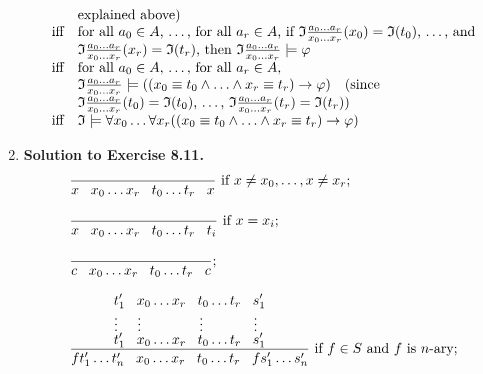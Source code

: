 \begin{enumerate}[1.]
\[\begin{array}{ll}
\, & \mbox{explained above)} \\
\mbox{iff} & \mbox{for all $a_0 \in A$, \ldots , for all $a_r \in A$, if $\mathfrak{I} \frac{a_0 \ldots a_r}{x_0 \ldots x_r}(x_0) = \mathfrak{I}(t_0)$, \ldots , and} \\
\, & \mbox{$\mathfrak{I} \frac{a_0 \ldots a_r}{x_0 \ldots x_r}(x_r) = \mathfrak{I}(t_r)$, then $\mathfrak{I} \frac{a_0 \ldots a_r}{x_0 \ldots x_r} \models \varphi$} \\
\mbox{iff} & \mbox{for all $a_0 \in A$, \ldots , for all $a_r \in A$,} \\
\, & \mbox{$\mathfrak{I} \frac{a_0 \ldots a_r}{x_0 \ldots x_r} \models ((x_0 \equiv t_0 \land \ldots \land x_r \equiv t_r) \rightarrow \varphi)$ \,\, (since} \\
\, & \mbox{$\mathfrak{I} \frac{a_0 \ldots a_r}{x_0 \ldots x_r}(t_0) = \mathfrak{I}(t_0)$, \ldots , $\mathfrak{I} \frac{a_0 \ldots a_r}{x_0 \ldots x_r}(t_r) = \mathfrak{I}(t_r)$)} \\
\mbox{iff} & \mathfrak{I} \models \forall x_0 \ldots \forall x_r (( x_0 \equiv t_0 \land \ldots \land x_r \equiv t_r ) \rightarrow \varphi )
\end{array}
\]
%
\item \textbf{Solution to Exercise 8.11.}
\[
\begin{array}{l}
\displaystyle \frac{\,}{x \;\;\; x_0 \ldots x_r \;\;\; t_0 \ldots t_r \;\;\; x} \mbox{ if $x \neq x_0, \ldots , x \neq x_r$}; \\
\, \\
\displaystyle \frac{\,}{x \;\;\; x_0 \ldots x_r \;\;\; t_0 \ldots t_r \;\;\; t_i} \mbox{ if $x = x_i$}; \\
\, \\
\displaystyle \frac{\,}{c \;\;\; x_0 \ldots x_r \;\;\; t_0 \ldots t_r \;\;\; c}; \\
\, \\
\displaystyle \frac{{{\displaystyle  t_1^\prime \;\;\; x_0 \ldots x_r \;\;\; t_0 \ldots t_r \;\;\; s_1^\prime 
\atop 
\displaystyle  \;\; \vdots  \;\;\;\;\;  \vdots  \;\;\;\;\;\;\;\;\;\;\;\;\;\;\;  \vdots  \;\;\;\;\;\;\;\;\;\;\;\;\; \vdots \;\;\;\; } 
\atop 
\displaystyle  t_1^\prime \;\;\; x_0 \ldots x_r \;\;\; t_0 \ldots t_r \;\;\; s_1^\prime}}{ft_1^\prime \ldots t_n^\prime \;\;\; x_0 \ldots x_r \;\;\; t_0 \ldots t_r \;\;\; fs_1^\prime \ldots s_n^\prime} \mbox{ if $f \in S$ and $f$ is $n$-ary}; \\

\end{array}\]
\end{enumerate}
